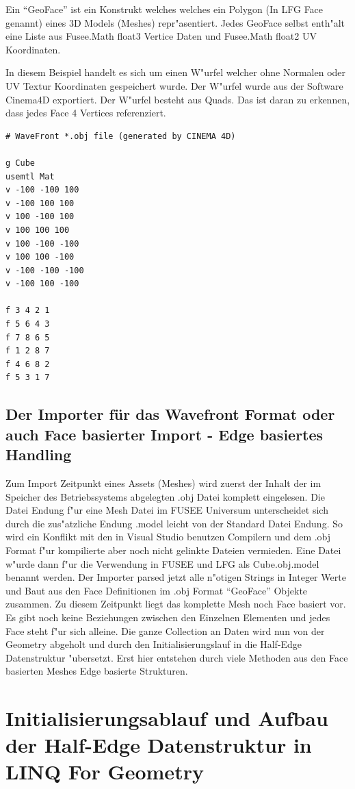 \documentclass[pagesize, paper=a4, fontsize=12pt,titlepage=true, headings=small, headnosepline, abstractoff, liststotoc, nochapterprefix, plainheadsepline]{scrreprt}
\newcommand{\LFG}{LINQ For Geometry}
\newcommand{\HES}{Half-Edge Datenstruktur }
\begin{document}
Ein "`GeoFace"' ist ein Konstrukt welches welches ein Polygon (In LFG Face genannt) eines 3D Models (Meshes) repr"asentiert. Jedes GeoFace selbst enth"alt eine Liste aus Fusee.Math float3 Vertice Daten und Fusee.Math float2 UV Koordinaten.
\newline

In diesem Beispiel handelt es sich um einen W"urfel welcher ohne Normalen oder UV Textur Koordinaten gespeichert wurde. Der W"urfel wurde aus der Software Cinema4D exportiert. Der W"urfel besteht aus Quads. Das ist daran zu erkennen, dass jedes Face 4 Vertices referenziert.
\begin{lstlisting}
# WaveFront *.obj file (generated by CINEMA 4D)

g Cube
usemtl Mat
v -100 -100 100
v -100 100 100
v 100 -100 100
v 100 100 100
v 100 -100 -100
v 100 100 -100
v -100 -100 -100
v -100 100 -100

f 3 4 2 1 
f 5 6 4 3 
f 7 8 6 5 
f 1 2 8 7 
f 4 6 8 2 
f 5 3 1 7 
\end{lstlisting}

		\subsection {Der Importer für das Wavefront Format oder auch Face basierter Import - Edge basiertes Handling}
			Zum Import Zeitpunkt eines Assets (Meshes) wird zuerst der Inhalt der im Speicher des Betriebssystems abgelegten .obj Datei komplett eingelesen. Die Datei Endung f"ur eine Mesh Datei im FUSEE Universum unterscheidet sich durch die zus"atzliche Endung .model leicht von der Standard Datei Endung. So wird ein Konflikt mit den in Visual Studio benutzen Compilern und dem .obj Format f"ur kompilierte aber noch nicht gelinkte Dateien vermieden. Eine Datei w"urde dann f"ur die Verwendung in FUSEE und LFG als Cube.obj.model benannt werden. Der Importer parsed jetzt alle n"otigen Strings in Integer Werte und Baut aus den Face Definitionen im .obj Format "`GeoFace"' Objekte zusammen. Zu diesem Zeitpunkt liegt das komplette Mesh noch Face basiert vor. Es gibt noch keine Beziehungen zwischen den Einzelnen Elementen und jedes Face steht f"ur sich alleine. Die ganze Collection an Daten wird nun von der Geometry abgeholt und durch den Initialisierungslauf in die \HES "ubersetzt. Erst hier entstehen durch viele Methoden aus den Face basierten Meshes Edge basierte Strukturen.
	\section {Initialisierungsablauf und Aufbau der \HES in \LFG}
\end{document}
